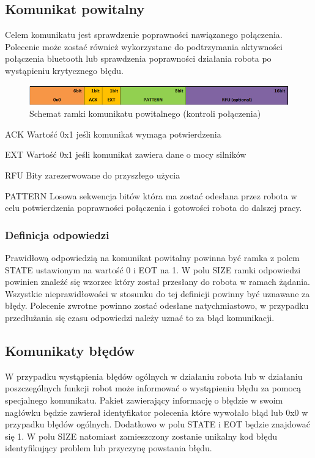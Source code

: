 \subsection{Komunikat powitalny}
Celem komunikatu jest sprawdzenie poprawności nawiązanego połączenia. Polecenie
może zostać również wykorzystane do podtrzymania aktywności połączenia bluetooth
lub sprawdzenia poprawności działania robota po wystąpieniu krytycznego błędu.

\begin{figure}[h!]
 \centering
 \includegraphics[width=\textwidth]{../images/appendix/cmd_0x00.png}
 \caption{Schemat ramki komunikatu powitalnego (kontroli połączenia)} 
 \label{fig:CMD_0x00}
\end{figure}

\begin{basedescript}{\desclabelstyle{\pushlabel}\desclabelwidth{25mm}}
\setlength{\parsep}{0pt}
\setlength{\itemsep}{0mm}
\setlength{\parskip}{0pt}
\item[ACK]
	Wartość 0x1 jeśli komunikat wymaga potwierdzenia
\item[EXT] 
	Wartość 0x1 jeśli komunikat zawiera dane o mocy silników
\item[RFU] 
	Bity zarezerwowane do przyszłego użycia
\item[PATTERN] 
	Losowa sekwencja bitów która ma zostać odesłana przez robota w celu
	potwierdzenia poprawności połączenia i gotowości robota do dalszej pracy.
\end{basedescript}

\subsubsection{Definicja odpowiedzi}
Prawidłową odpowiedzią na komunikat powitalny powinna być ramka z polem STATE
ustawionym na wartość 0 i EOT na 1. W polu SIZE ramki odpowiedzi powinien
znaleźć się wzorzec który został przesłany do robota w ramach żądania.
Wszystkie nieprawidłowości w stosunku do tej definicji powinny być uznawane za
błędy. Polecenie zwrotne powinno zostać odesłane natychmiastowo, w przypadku
przedłużania się czasu odpowiedzi należy uznać to za błąd komunikacji. 
\newpage
\subsection{Komunikaty błędów}
W przypadku wystąpienia błędów ogólnych w działaniu robota lub w działaniu
poszczególnych funkcji robot może informować o wystąpieniu błędu za pomocą
specjalnego komunikatu. Pakiet zawierający informację o błędzie w swoim nagłówku
będzie zawierał identyfikator polecenia które wywołało błąd lub 0x0 w przypadku
błędów ogólnych. Dodatkowo w polu STATE i EOT będzie znajdować się 1. W polu
SIZE natomiast zamieszczony zostanie unikalny kod błędu identyfikujący
problem lub przyczynę powstania błędu.